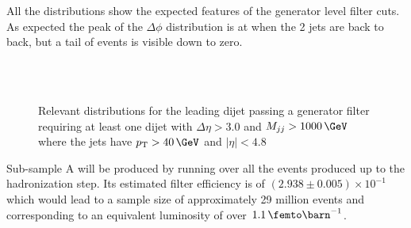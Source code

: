 All the distributions show the expected features of the generator level filter cuts. As expected the peak of the $\Delta\phi$ distribution is at \pi when the 2 jets are back to back, but a tail of events is visible down to zero.

\begin{figure}[!htp]%
\centering
{}\qquad
{}\\
\\
\caption{Relevant distributions for the leading dijet passing a generator filter requiring at least one dijet with $\Delta\eta>3.0$ and $M_{jj}>1000\,\GeV$ where the jets have $\pt>40\,\GeV$ and $|\eta|<4.8$}
\label{FIGURE:RunIIPreparation_PassGeneratorFilterDistributions2}
\end{figure}

Sub-sample A will be produced by running over all the events produced up to the hadronization step. Its estimated filter efficiency is of $(2.938 \pm 0.005) \times 10^{-1}$ which would lead to a sample size of approximately 29 million events and corresponding to an equivalent luminosity of over $1.1\,\femto\barn^{-1}$.

